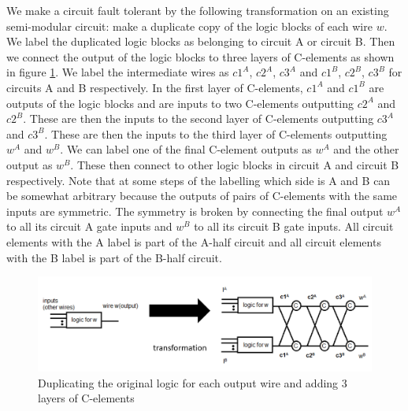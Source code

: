 \documentclass[12pt]{report}
\begin{document}
We make a circuit fault tolerant by the following transformation on an existing semi-modular circuit: make a duplicate copy of the logic blocks of each wire $w$.  We label the duplicated logic blocks as belonging to circuit A or circuit B.  Then we connect the output of the logic blocks to three layers of C-elements as shown in figure \ref{fig:dupscheme}.  We label the intermediate wires as $c1^A$, $c2^A$, $c3^A$ and $c1^B$, $c2^B$, $c3^B$ for circuits A and B respectively.  In the first layer of C-elements, $c1^A$ and $c1^B$ are outputs of the logic blocks and are inputs to two C-elements outputting $c2^A$ and $c2^B$.  These are then the inputs to the second layer of C-elements outputting $c3^A$ and $c3^B$.  These are then the inputs to the third layer of C-elements outputting $w^A$ and $w^B$.  We can label one of the final C-element outputs as $w^A$ and the other output as $w^B$.  These then connect to other logic blocks in circuit A and circuit B respectively.  Note that at some steps of the labelling which side is A and B can be somewhat arbitrary because the outputs of pairs of C-elements with the same inputs are symmetric.  The symmetry is broken by connecting the final output $w^A$ to all its circuit A gate inputs and $w^B$ to all its circuit B gate inputs.  All circuit elements with the A label is part of the A-half circuit and all circuit elements with the B label is part of the B-half circuit.\\%
\begin{figure}
  \centering
    \includegraphics[width=\textwidth]{circuitforproof3}
  \caption{Duplicating the original logic for each output wire and adding 3 layers of C-elements}
  \label{fig:dupscheme}
\end{figure}
\end{document}
